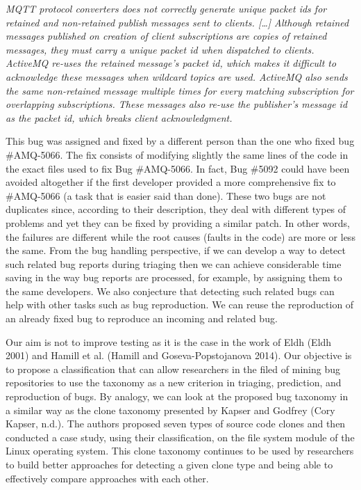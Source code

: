 \documentclass[natbib]{svjour3}
\begin{document}
\emph{MQTT protocol converters does not correctly generate unique packet
ids for retained and non-retained publish messages sent to clients.
{[}\ldots{}{]} Although retained messages published on creation of
client subscriptions are copies of retained messages, they must carry a
unique packet id when dispatched to clients. ActiveMQ re-uses the
retained message's packet id, which makes it difficult to acknowledge
these messages when wildcard topics are used. ActiveMQ also sends the
same non-retained message multiple times for every matching subscription
for overlapping subscriptions. These messages also re-use the
publisher's message id as the packet id, which breaks client
acknowledgment.}

This bug was assigned and fixed by a different person than the one who
fixed bug \#AMQ-5066. The fix consists of modifying slightly the same
lines of the code in the exact files used to fix Bug \#AMQ-5066. In
fact, Bug \#5092 could have been avoided altogether if the first
developer provided a more comprehensive fix to \#AMQ-5066 (a task that
is easier said than done). These two bugs are not duplicates since,
according to their description, they deal with different types of
problems and yet they can be fixed by providing a similar patch. In
other words, the failures are different while the root causes (faults in
the code) are more or less the same. From the bug handling perspective,
if we can develop a way to detect such related bug reports during
triaging then we can achieve considerable time saving in the way bug
reports are processed, for example, by assigning them to the same
developers. We also conjecture that detecting such related bugs can help
with other tasks such as bug reproduction. We can reuse the reproduction
of an already fixed bug to reproduce an incoming and related bug.

Our aim is not to improve testing as it is the case in the work of Eldh
(Eldh 2001) and Hamill et al. (Hamill and Goseva-Popstojanova 2014). Our
objective is to propose a classification that can allow researchers in
the filed of mining bug repositories to use the taxonomy as a new
criterion in triaging, prediction, and reproduction of bugs. By analogy,
we can look at the proposed bug taxonomy in a similar way as the clone
taxonomy presented by Kapser and Godfrey (Cory Kapser, n.d.). The
authors proposed seven types of source code clones and then conducted a
case study, using their classification, on the file system module of the
Linux operating system. This clone taxonomy continues to be used by
researchers to build better approaches for detecting a given clone type
and being able to effectively compare approaches with each other.
\end{document}
